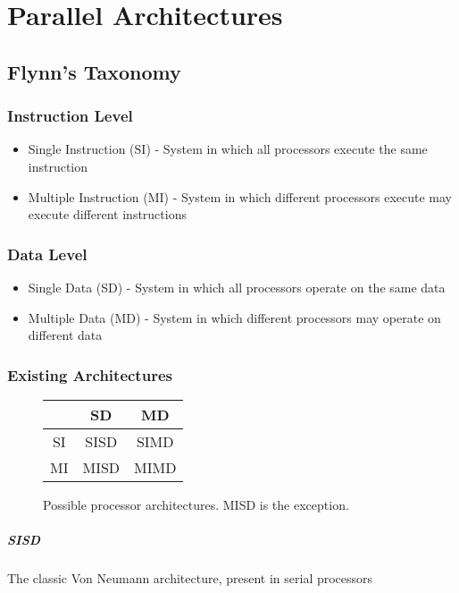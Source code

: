 \chapter{Parallel Architectures}

\section{Flynn's Taxonomy}

\subsection{Instruction Level}
\begin{itemize}
    \item Single Instruction (SI) - System in which all processors execute the same instruction
    \item Multiple Instruction (MI) - System in which different processors execute may execute different instructions
\end{itemize}

\subsection{Data Level}
\begin{itemize}
    \item Single Data (SD) - System in which all processors operate on the same data
    \item Multiple Data (MD) - System in which different processors may operate on different data
\end{itemize}

\subsection{Existing Architectures}

\begin{figure}
    \centering
    \begin{tabular}{c | c | c}
           & SD   & MD   \\
        \hline
        SI & SISD & SIMD \\
        \hline
        MI & MISD & MIMD \\
    \end{tabular}
    \caption{Possible processor architectures. MISD is the exception.}
    \label{fig:flynn}
\end{figure}

\paragraph{SISD}
The classic Von Neumann architecture, present in serial processors


